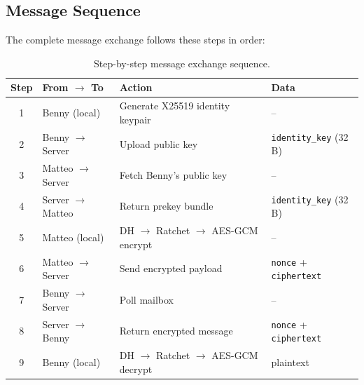 \documentclass[12pt,a4paper]{article}
\begin{document}
\subsection{Message Sequence}

The complete message exchange follows these steps in order:

\begin{table}[H]
\centering
\small
\begin{tabular}{c l l l}
\toprule
\textbf{Step} & \textbf{From $\rightarrow$ To} & \textbf{Action} & \textbf{Data} \\
\midrule
1 & Benny (local) & Generate X25519 identity keypair & -- \\
2 & Benny $\rightarrow$ Server & Upload public key & \texttt{identity\_key} (32\,B) \\
3 & Matteo $\rightarrow$ Server & Fetch Benny's public key & -- \\
4 & Server $\rightarrow$ Matteo & Return prekey bundle & \texttt{identity\_key} (32\,B) \\
5 & Matteo (local) & DH $\rightarrow$ Ratchet $\rightarrow$ AES-GCM encrypt & -- \\
6 & Matteo $\rightarrow$ Server & Send encrypted payload & \texttt{nonce} + \texttt{ciphertext} \\
7 & Benny $\rightarrow$ Server & Poll mailbox & -- \\
8 & Server $\rightarrow$ Benny & Return encrypted message & \texttt{nonce} + \texttt{ciphertext} \\
9 & Benny (local) & DH $\rightarrow$ Ratchet $\rightarrow$ AES-GCM decrypt & plaintext \\
\bottomrule
\end{tabular}
\caption{Step-by-step message exchange sequence.}
\label{tab:seq}
\end{table}

\vspace{-4pt}
\end{document}
